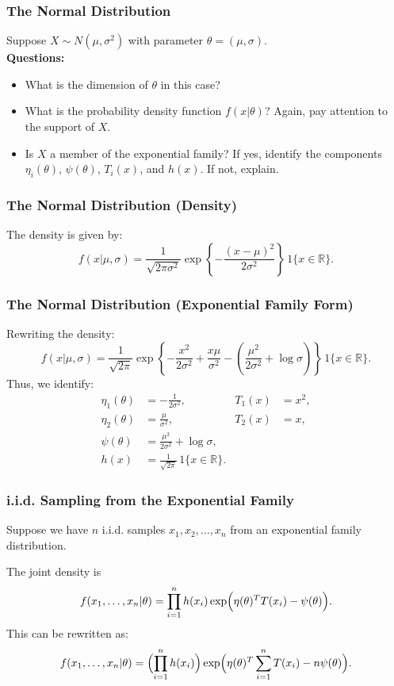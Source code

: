 \documentclass{beamer}
\begin{document}
\begin{frame}
\frametitle{The Normal Distribution}
Suppose $X \sim N(\mu, \sigma^2)$ with parameter $\theta=(\mu,\sigma)$.\\[1em]
\textbf{Questions:}
\begin{itemize}
  \item What is the dimension of $\theta$ in this case?
  \item What is the probability density function $f(x|\theta)$? Again, pay attention to the support of $X.$
  \item Is $X$ a member of the exponential family? If yes, identify the components $\eta_i(\theta)$, $\psi(\theta)$, $T_i(x)$, and $h(x)$. If not, explain.
\end{itemize}
\end{frame}

\begin{frame}
\frametitle{The Normal Distribution (Density)}
The density is given by:
\[
f(x|\mu,\sigma) = \frac{1}{\sqrt{2\pi\sigma^2}} \exp\left\{-\frac{(x-\mu)^2}{2\sigma^2}\right\} \, 1\{x \in \mathbb{R}\}.
\]
\end{frame}

\begin{frame}
\frametitle{The Normal Distribution (Exponential Family Form)}
Rewriting the density:
\[
f(x|\mu,\sigma) = \frac{1}{\sqrt{2\pi}} \exp\!\left\{-\frac{x^2}{2\sigma^2} + \frac{x\mu}{\sigma^2} -\left(\frac{\mu^2}{2\sigma^2} + \log\sigma\right)\right\} \, 1\{x\in\mathbb{R}\}.
\]
Thus, we identify:
\begin{align*}
\eta_1(\theta) &= -\frac{1}{2\sigma^2}, \quad &T_1(x) &= x^2,\\[1mm]
\eta_2(\theta) &= \frac{\mu}{\sigma^2}, \quad &T_2(x) &= x,\\[1mm]
\psi(\theta) &= \frac{\mu^2}{2\sigma^2} + \log\sigma,\\[1mm]
h(x) &= \frac{1}{\sqrt{2\pi}} \, 1\{x\in\mathbb{R}\}.
\end{align*}
\end{frame}

\begin{frame}
\frametitle{i.i.d. Sampling from the Exponential Family}
Suppose we have $n$ i.i.d. samples $x_1,x_2,\dots,x_n$ from an exponential family distribution. 

\vspace*{1em}
The joint density is 
\[
f(x_1,\dots,x_n|\theta) = \prod_{i=1}^n h(x_i)\exp\Bigl(\eta(\theta)^T T(x_i) - \psi(\theta)\Bigr).
\]
This can be rewritten as:
\[
f(x_1,\dots,x_n|\theta) = \Bigl(\prod_{i=1}^n h(x_i)\Bigr)\exp\Bigl(\eta(\theta)^T \sum_{i=1}^n T(x_i) - n\psi(\theta)\Bigr).
\]
\end{frame}
\end{document}
